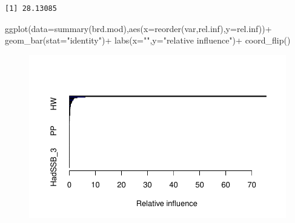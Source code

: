 \documentclass[
  letterpaper,
  DIV=11,
  numbers=noendperiod]{scrartcl}
\newenvironment{Shaded}{\begin{snugshade}}{\end{snugshade}}
\newcommand{\AttributeTok}[1]{\textcolor[rgb]{0.40,0.45,0.13}{#1}}
\newcommand{\DecValTok}[1]{\textcolor[rgb]{0.68,0.00,0.00}{#1}}
\newcommand{\FunctionTok}[1]{\textcolor[rgb]{0.28,0.35,0.67}{#1}}
\newcommand{\NormalTok}[1]{\textcolor[rgb]{0.00,0.23,0.31}{#1}}
\newcommand{\OtherTok}[1]{\textcolor[rgb]{0.00,0.23,0.31}{#1}}
\newcommand{\SpecialCharTok}[1]{\textcolor[rgb]{0.37,0.37,0.37}{#1}}
\newcommand{\StringTok}[1]{\textcolor[rgb]{0.13,0.47,0.30}{#1}}
\begin{document}
\begin{Shaded}
\end{Shaded}

\begin{verbatim}
[1] 28.13085
\end{verbatim}

\begin{Shaded}
\begin{Highlighting}[]
\FunctionTok{ggplot}\NormalTok{(}\AttributeTok{data=}\FunctionTok{summary}\NormalTok{(brd.mod),}\FunctionTok{aes}\NormalTok{(}\AttributeTok{x=}\FunctionTok{reorder}\NormalTok{(var,rel.inf),}\AttributeTok{y=}\NormalTok{rel.inf))}\SpecialCharTok{+}
  \FunctionTok{geom\_bar}\NormalTok{(}\AttributeTok{stat=}\StringTok{"identity"}\NormalTok{)}\SpecialCharTok{+}
  \FunctionTok{labs}\NormalTok{(}\AttributeTok{x=}\StringTok{""}\NormalTok{,}\AttributeTok{y=}\StringTok{"relative influence"}\NormalTok{)}\SpecialCharTok{+}
  \FunctionTok{coord\_flip}\NormalTok{()}
\end{Highlighting}
\end{Shaded}

\begin{figure}[H]

{\centering \includegraphics{Preliminary-Results_files/figure-pdf/Boosted Regression Trees-2.pdf}

}

\end{figure}
\end{document}
